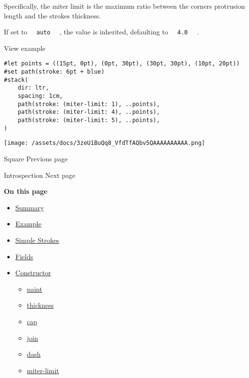 Specifically, the miter limit is the maximum ratio between the
corner\textquotesingle s protrusion length and the
stroke\textquotesingle s thickness.

If set to \texttt{\ }{\texttt{\ auto\ }}\texttt{\ } , the value is
inherited, defaulting to \texttt{\ }{\texttt{\ 4.0\ }}\texttt{\ } .


View example

\begin{verbatim}
#let points = ((15pt, 0pt), (0pt, 30pt), (30pt, 30pt), (10pt, 20pt))
#set path(stroke: 6pt + blue)
#stack(
    dir: ltr,
    spacing: 1cm,
    path(stroke: (miter-limit: 1), ..points),
    path(stroke: (miter-limit: 4), ..points),
    path(stroke: (miter-limit: 5), ..points),
)
\end{verbatim}

\texttt{[image: /assets/docs/3zeU1BuQq8\_VfdTfAQbv5QAAAAAAAAAA.png]}

\href{/docs/reference/visualize/square/}{\pandocbounded{}}

{ Square } { Previous page }

\href{/docs/reference/introspection/}{\pandocbounded{}}

{ Introspection } { Next page }

\textbf{On this page}

\begin{itemize}
\tightlist
\item
  \hyperref[summary]{Summary}
\item
  \hyperref[example]{Example}
\item
  \hyperref[simple-strokes]{Simple Strokes}
\item
  \hyperref[fields]{Fields}
\item
  \hyperref[constructor]{Constructor}

  \begin{itemize}
  \tightlist
  \item
    \hyperref[constructor-paint]{paint}
  \item
    \hyperref[constructor-thickness]{thickness}
  \item
    \hyperref[constructor-cap]{cap}
  \item
    \hyperref[constructor-join]{join}
  \item
    \hyperref[constructor-dash]{dash}
  \item
    \hyperref[constructor-miter-limit]{miter-limit}
  \end{itemize}
\end{itemize}


